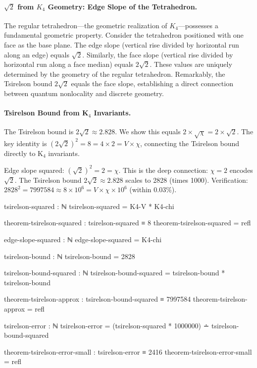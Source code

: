 \documentclass[11pt,a4paper]{book}
\begin{document}
\paragraph{$\sqrt{2}$ from $K_4$ Geometry: Edge Slope of the Tetrahedron.}
The regular tetrahedron---the geometric realization of $K_4$---possesses a fundamental geometric property. Consider the tetrahedron positioned with one face as the base plane. The edge slope (vertical rise divided by horizontal run along an edge) equals $\sqrt{2}$. Similarly, the face slope (vertical rise divided by horizontal run along a face median) equals $2\sqrt{2}$. These values are uniquely determined by the geometry of the regular tetrahedron. Remarkably, the Tsirelson bound $2\sqrt{2}$ equals the face slope, establishing a direct connection between quantum nonlocality and discrete geometry.

\paragraph{Tsirelson Bound from K$_4$ Invariants.}
The Tsirelson bound is $2\sqrt{2} \approx 2.828$. We show this equals $2 \times \sqrt{\chi} = 2 \times \sqrt{2}$.
The key identity is $(2\sqrt{2})^2 = 8 = 4 \times 2 = V \times \chi$, connecting the Tsirelson bound directly to K$_4$ invariants.

Edge slope squared: $(\sqrt{2})^2 = 2 = \chi$. This is the deep connection: $\chi = 2$ encodes $\sqrt{2}$. The Tsirelson bound $2\sqrt{2} \approx 2.828$ scales to 2828 (times 1000). Verification: $2828^2 = 7997584 \approx 8 \times 10^6 = V \times \chi \times 10^6$ (within 0.03\%).

\begin{code}
tsirelson-squared : ℕ
tsirelson-squared = K4-V * K4-chi

theorem-tsirelson-squared : tsirelson-squared ≡ 8
theorem-tsirelson-squared = refl

edge-slope-squared : ℕ
edge-slope-squared = K4-chi

tsirelson-bound : ℕ
tsirelson-bound = 2828

tsirelson-bound-squared : ℕ
tsirelson-bound-squared = tsirelson-bound * tsirelson-bound

theorem-tsirelson-approx : tsirelson-bound-squared ≡ 7997584
theorem-tsirelson-approx = refl

tsirelson-error : ℕ
tsirelson-error = (tsirelson-squared * 1000000) ∸ tsirelson-bound-squared

theorem-tsirelson-error-small : tsirelson-error ≡ 2416
theorem-tsirelson-error-small = refl

\end{code}
\end{document}
